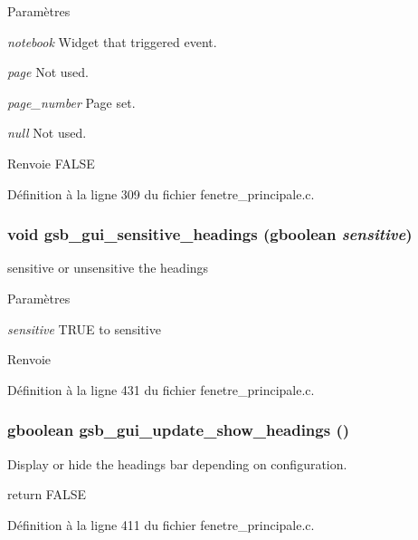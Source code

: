 \begin{DoxyParams}{Paramètres}
\item[{\em notebook}]Widget that triggered event. \item[{\em page}]Not used. \item[{\em page\_\-number}]Page set. \item[{\em null}]Not used.\end{DoxyParams}
\begin{DoxyReturn}{Renvoie}
FALSE 
\end{DoxyReturn}


Définition à la ligne 309 du fichier fenetre\_\-principale.c.

\subsubsection[{gsb\_\-gui\_\-sensitive\_\-headings}]{\setlength{\rightskip}{0pt plus 5cm}void gsb\_\-gui\_\-sensitive\_\-headings (gboolean {\em sensitive})}\label{fenetre__principale_8h_a94542c45fb71a3cd8b955b5e0fcc2ed9}
sensitive or unsensitive the headings


\begin{DoxyParams}{Paramètres}
\item[{\em sensitive}]TRUE to sensitive\end{DoxyParams}
\begin{DoxyReturn}{Renvoie}

\end{DoxyReturn}


Définition à la ligne 431 du fichier fenetre\_\-principale.c.

\subsubsection[{gsb\_\-gui\_\-update\_\-show\_\-headings}]{\setlength{\rightskip}{0pt plus 5cm}gboolean gsb\_\-gui\_\-update\_\-show\_\-headings ()}\label{fenetre__principale_8h_a1ea5e5d9534b171d1062af58ac8c6f3b}
Display or hide the headings bar depending on configuration.

return FALSE 

Définition à la ligne 411 du fichier fenetre\_\-principale.c.

